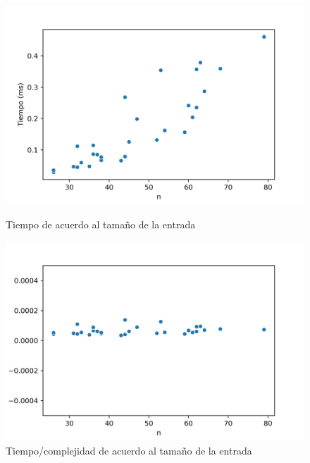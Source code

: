 \begin{figure}[H]
	\centering
	\begin{minipage}{0.44\textwidth}
		\centering
		\includegraphics[width=1\textwidth]{images/kmeans/tiempokmeans}
		\caption{\footnotesize Tiempo de acuerdo al tamaño de la entrada}
		\label{fig:kmeans-tiempos}
	\end{minipage}%
	\hspace{0.03\textwidth}
	\begin{minipage}{0.44\textwidth}
		\centering
		\includegraphics[width=1\textwidth]{images/kmeans/kmeanscte}
		\caption{\footnotesize Tiempo/complejidad de acuerdo al tamaño de la entrada}
		\label{fig:kmeans-cte}
	\end{minipage}%
\end{figure}

